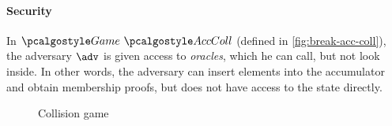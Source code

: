 \paragraph{Security}

In $\Game~\algo{AccColl}$ (defined in \autoref{fig:break-acc-coll}), the adversary $\adv$ is given access to \emph{oracles}, which he can call, but not look inside.
In other words, the adversary can insert elements into the accumulator and obtain membership proofs, but does not have access to the state directly.

\begin{figure}[tbhp]
  \begin{center}
    \begin{tcolorbox}[width=13cm]
      \begin{pcvstack}[center]
        \pcvspace
        \begin{pchstack}[center]
        \pchspace
        \end{pchstack}
      \end{pcvstack}
    \end{tcolorbox}
  \end{center}
  \caption{Collision game \label{fig:break-acc-coll}}
\end{figure}

